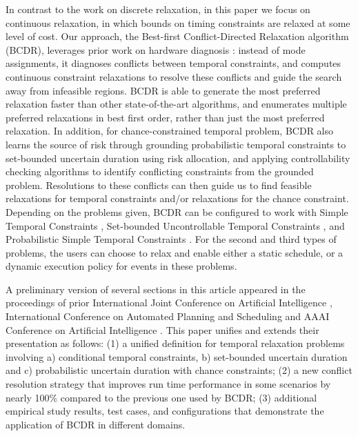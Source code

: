 \documentclass[jair,twoside,11pt,theapa]{article}
\begin{document}
In contrast to the work on discrete relaxation, in this paper we focus on continuous relaxation, in which bounds on timing constraints are relaxed at some level of cost. Our approach, the Best-first
Conflict-Directed Relaxation algorithm (BCDR),
leverages prior work on hardware diagnosis \cite{DMS1987,Williams_CDAstar_2002}:
instead of mode assignments, it diagnoses conflicts between temporal
constraints, and computes continuous constraint relaxations to resolve these
conflicts and guide the search away from infeasible regions. BCDR is able to
generate the most preferred relaxation faster than other state-of-the-art
algorithms, and enumerates multiple preferred relaxations in best first order,
rather than just the most preferred relaxation. In addition, for
chance-constrained temporal problem, BCDR also learns the source of risk through
grounding probabilistic temporal constraints to set-bounded uncertain duration
using risk allocation, and applying controllability checking algorithms to
identify conflicting constraints from the grounded problem. Resolutions to these
conflicts can then guide us to find feasible relaxations for temporal
constraints and/or relaxations for the chance constraint. Depending on the
problems given, BCDR can be configured to work with Simple Temporal Constraints
\cite{Dechter_TCN_1991}, Set-bounded Uncontrollable Temporal Constraints
\cite{Vidal99handlingcontingency}, and Probabilistic Simple Temporal Constraints
\cite{Tsamardinos02aprobabilistic}. For the second and third types of problems,
the users can choose to relax and enable either a static schedule, or a dynamic
execution policy for events in these problems.


A preliminary version of several sections in this article appeared in the
proceedings of prior International Joint Conference on Artificial Intelligence \cite{Yu_BCDR_2013},  International Conference on Automated Planning and Scheduling
\cite{Yu_CDRU_2014,cui2015optimising} and AAAI Conference on Artificial Intelligence \cite{Fang_AAAI_2014,Yu_AAAI_2015}.
This paper unifies and extends their presentation as follows: (1) a unified
definition for temporal relaxation problems involving a) conditional temporal
constraints, b) set-bounded uncertain duration and c) probabilistic uncertain
duration with chance constraints; (2) a new conflict resolution strategy that
improves run time performance in some scenarios by nearly 100\% compared to the
previous one used by BCDR; (3) additional empirical study results, test cases, and configurations that
demonstrate the application of BCDR in different domains.
\end{document}
